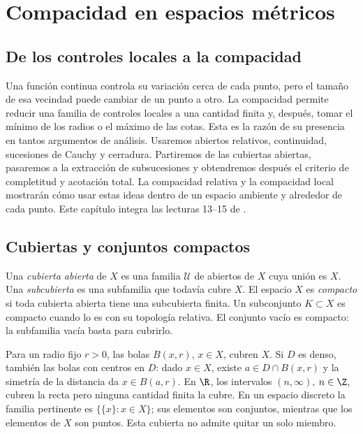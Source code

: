 \chapter{Compacidad en espacios métricos}\label{cap:nuevo05}\label{chap:13}\label{chap:14}\label{chap:15}

\section{De los controles locales a la compacidad}\label{lectura:13}
Una función continua controla su variación cerca de cada punto, pero el tamaño de esa vecindad puede cambiar de un punto a otro. La compacidad permite reducir una familia de controles locales a una cantidad finita y, después, tomar el mínimo de los radios o el máximo de las cotas. Esta es la razón de su presencia en tantos argumentos de análisis. Usaremos abiertos relativos, continuidad, sucesiones de Cauchy y cerradura. Partiremos de las cubiertas abiertas, pasaremos a la extracción de subsucesiones y obtendremos después el criterio de completitud y acotación total. La compacidad relativa y la compacidad local mostrarán cómo usar estas ideas dentro de un espacio ambiente y alrededor de cada punto. Este capítulo integra las lecturas 13--15 de \cite{valencia}.

\section{Cubiertas y conjuntos compactos}
\begin{definicion}
Una \emph{cubierta abierta} de $X$ es una familia $\mathcal U$ de abiertos de $X$ cuya unión es $X$. Una \emph{subcubierta} es una subfamilia que todavía cubre $X$. El espacio $X$ es \emph{compacto} si toda cubierta abierta tiene una subcubierta finita. Un subconjunto $K\subset X$ es compacto cuando lo es con su topología relativa. El conjunto vacío es compacto: la subfamilia vacía basta para cubrirlo.
\end{definicion}
Para un radio fijo $r>0$, las bolas $B(x,r)$, $x\in X$, cubren $X$. Si $D$ es denso, también las bolas con centros en $D$: dado $x\in X$, existe $a\in D\cap B(x,r)$ y la simetría de la distancia da $x\in B(a,r)$. En $\R$, los intervalos $(n,\infty)$, $n\in\Z$, cubren la recta pero ninguna cantidad finita la cubre. En un espacio discreto la familia pertinente es $\{\{x\}:x\in X\}$; sus elementos son conjuntos, mientras que los elementos de $X$ son puntos. Esta cubierta no admite quitar un solo miembro.


